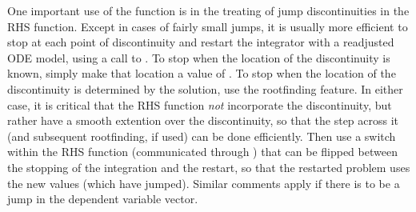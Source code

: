 \documentclass[letterpaper,10pt,english]{sphinxmanual}
\begin{document}
One important use of the {\hyperref[c_interface/User_callable:c.ARKodeReInit]{\emph{}}} function is in the
treating of jump discontinuities in the RHS function.  Except in cases
of fairly small jumps, it is usually more efficient to stop at each
point of discontinuity and restart the integrator with a readjusted
ODE model, using a call to {\hyperref[c_interface/User_callable:c.ARKodeReInit]{\emph{}}}.  To stop when the
location of the discontinuity is known, simply make that location a
value of .  To stop when the location of the discontinuity is
determined by the solution, use the rootfinding feature.  In either
case, it is critical that the RHS function \emph{not} incorporate the
discontinuity, but rather have a smooth extention over the
discontinuity, so that the step across it (and subsequent rootfinding,
if used) can be done efficiently.  Then use a switch within the RHS
function (communicated through ) that can be flipped
between the stopping of the integration and the restart, so that the
restarted problem uses the new values (which have jumped).  Similar
comments apply if there is to be a jump in the dependent variable
vector.
\end{document}
